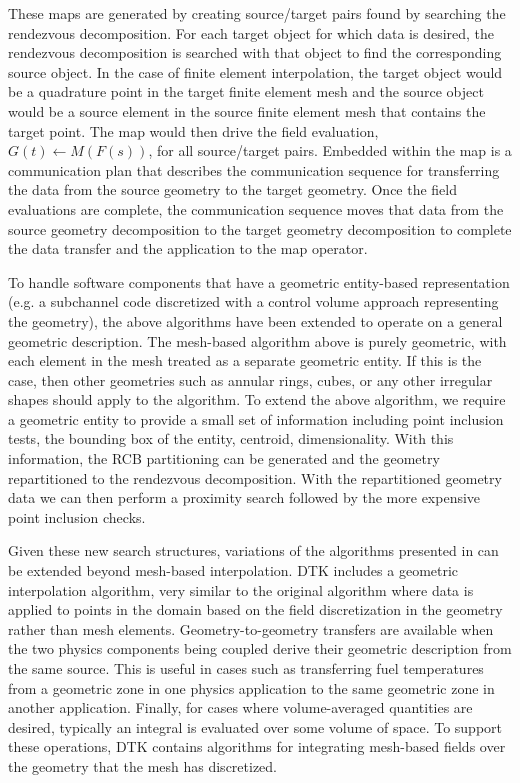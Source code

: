 \documentclass{mc2013}
\begin{document}
These maps are generated by creating source/target pairs found by
searching the rendezvous decomposition. For each target object for
which data is desired, the rendezvous decomposition is searched with
that object to find the corresponding source object. In the case of
finite element interpolation, the target object would be a quadrature
point in the target finite element mesh and the source object would be
a source element in the source finite element mesh that contains the
target point. The map would then drive the field evaluation,
$G(t)\leftarrow M(F(s))$, for all source/target pairs. Embedded within
the map is a communication plan that describes the communication
sequence for transferring the data from the source geometry to the
target geometry. Once the field evaluations are complete, the
communication sequence moves that data from the source geometry
decomposition to the target geometry decomposition to complete the
data transfer and the application to the map operator.

\label{subsec:general_geometry}

To handle software components that have a geometric entity-based
representation (e.g. a subchannel code discretized with a control
volume approach representing the geometry), the above algorithms have
been extended to operate on a general geometric description. The
mesh-based algorithm above is purely geometric, with each element in
the mesh treated as a separate geometric entity. If this is the case,
then other geometries such as annular rings, cubes, or any other
irregular shapes should apply to the algorithm. To extend the above
algorithm, we require a geometric entity to provide a small set of
information including point inclusion tests, the bounding box of the
entity, centroid, dimensionality. With this information, the RCB
partitioning can be generated and the geometry repartitioned to the
rendezvous decomposition. With the repartitioned geometry data we can
then perform a proximity search followed by the more expensive point
inclusion checks.

Given these new search structures, variations of the algorithms
presented in \cite{Plimpton_2004} can be extended beyond mesh-based
interpolation. DTK includes a geometric interpolation algorithm, very
similar to the original algorithm where data is applied to points in
the domain based on the field discretization in the geometry rather
than mesh elements. Geometry-to-geometry transfers are available when
the two physics components being coupled derive their geometric
description from the same source. This is useful in cases such as
transferring fuel temperatures from a geometric zone in one physics
application to the same geometric zone in another
application. Finally, for cases where volume-averaged quantities are
desired, typically an integral is evaluated over some volume of
space. To support these operations, DTK contains algorithms for
integrating mesh-based fields over the geometry that the mesh has
discretized.
\end{document}
